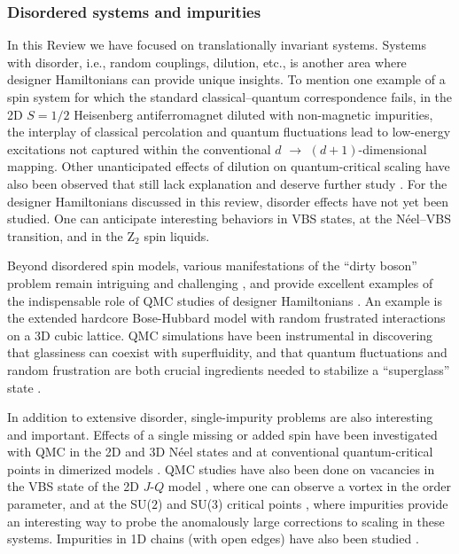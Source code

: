 \documentclass[10pt,pre,aps,twocolumn,showpacs,subscriptaddresses,floatfix]{revtex4}
\begin{document}
\subsubsection{Disordered systems and impurities}

In this Review we have focused on translationally invariant systems. Systems with disorder, i.e., random couplings, dilution, etc., is another area where designer 
Hamiltonians can provide unique insights. To mention one example of a spin system for which the standard classical--quantum correspondence fails, in the 2D $S=1/2$ 
Heisenberg antiferromagnet diluted with non-magnetic impurities, the interplay of classical percolation and quantum fluctuations lead to low-energy 
excitations \cite{Wang10} not captured \cite{Vojta05} within the conventional $d$ $\to$ $(d+1)$-dimensional mapping. Other unanticipated effects of dilution 
on quantum-critical scaling have also been observed that still lack explanation and deserve further study \cite{Yu06,Roscilde06,Sandvik06,Roscilde07,Yao10}. 
For the designer Hamiltonians discussed in this review, disorder effects have not yet been studied. One can anticipate interesting behaviors in VBS states, 
at the N\'eel--VBS transition, and in the Z$_2$ spin liquids. 

Beyond disordered spin models, various manifestations of the ``dirty boson'' problem remain intriguing and challenging \cite{Pollet09,Meier12,Iyer12}, and provide 
excellent examples of the indispensable role of QMC studies of designer Hamiltonians \cite{Gurarie09}. An example is the extended hardcore Bose-Hubbard model with 
random frustrated interactions on a 3D cubic lattice. QMC simulations have been instrumental in discovering that glassiness can coexist with superfluidity, 
and that quantum fluctuations and random frustration are both crucial ingredients needed to stabilize a ``superglass'' state \cite{superglass1,superglass2}.

In addition to extensive disorder, single-impurity problems are also interesting and important. Effects of a single missing or added spin have been
investigated with QMC in the 2D and 3D N\'eel states \cite{Hoglund04,Liu09} and at conventional quantum-critical points in dimerized models \cite{Hoglund07}. 
QMC studies have also been done on vacancies in the VBS state of the 2D $J$-$Q$ model \cite{Kaul08}, where one can observe a vortex in the order parameter, 
and at the SU($2$) and SU($3$) critical points \cite{banerjee2010:log,banerjee2010:su3}, where impurities provide an interesting way to probe the anomalously 
large corrections to scaling in these systems. Impurities in 1D chains (with open edges) have also been studied \cite{Sanyal11}.
\end{document}
